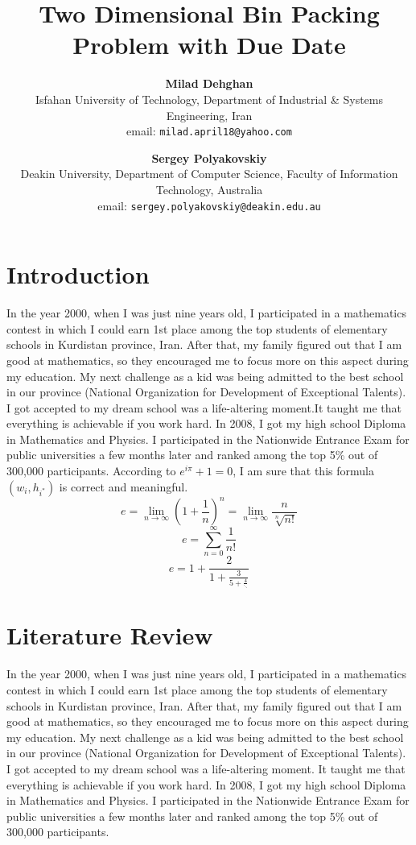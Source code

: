 \documentclass[11pt,a4paper,twocolumn]{article}
\title{\textbf{Two Dimensional Bin Packing Problem with Due Date}}
\author{\textbf{Milad Dehghan}\\
Isfahan University of Technology, Department of Industrial \& Systems Engineering, Iran\\
email: \texttt{milad.april18@yahoo.com}\\
\and\textbf{Sergey Polyakovskiy}\\
Deakin University, Department of Computer Science, Faculty of Information Technology, Australia\\
email: \texttt{sergey.polyakovskiy@deakin.edu.au}
}
\date{}
\begin{document}
\maketitle
\tableofcontents
\section{Introduction}\label{section.intro}

In the year 2000, when I was just nine years old, I participated in a mathematics contest in which I could earn 1st place among the top students of elementary schools in Kurdistan province, Iran. After that, my family figured out that I am good at mathematics, so they encouraged me to focus more on this aspect during my education. My next challenge as a kid was being admitted to the best school in our province (National Organization for Development of Exceptional Talents). I got accepted to my dream school was a life-altering moment.It taught me that everything is achievable if you work hard. In 2008, I got my high school Diploma in Mathematics and Physics. I participated in the Nationwide Entrance Exam for public universities a few months later and ranked among the top 5\% out of 300,000 participants. According to $e^{i\pi}+1=0$, I am sure that this formula$ (w_{i},h_{i^{*}})$ is correct and meaningful. $$e=\lim_{n\to\infty} \left(1+\frac{1}{n}\right)^n=\lim_{n\to\infty}\frac{n}{\sqrt[n]{n!}} $$
\begin{equation}e=\sum_{n=0}^{\infty}\frac{1}{n!}\end{equation}
\begin{equation}e=1+\frac{2}{1+\frac{3}{5+\frac{4}{\ddots}}}\end{equation}

\section{Literature Review}\label{section.litre}
In the year 2000, when I was just nine years old, I participated in a mathematics contest in which I could earn 1st place among the top students of elementary schools in Kurdistan province, Iran. After that, my family figured out that I am good at mathematics, so they encouraged me to focus more on this aspect during my education. My next challenge as a kid was being admitted to the best school in our province (National Organization for Development of Exceptional Talents). I got accepted to my dream school was a life-altering moment. It taught me that everything is achievable if you work hard. In 2008, I got my high school Diploma in Mathematics and Physics. I participated in the Nationwide Entrance Exam for public universities a few months later and ranked among the top 5\% out of 300,000 participants.\\
\end{document}
